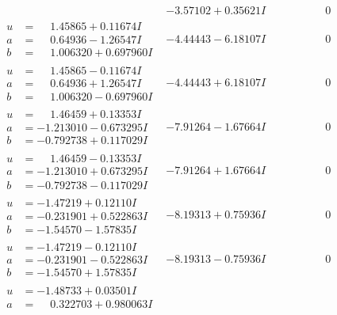 \documentclass[1p]{elsarticle_modified}
\theoremstyle{definition}
\begin{document}
$$\begin{array}{c|c|c}
 & -3.57102 + 0.35621 I & \phantom{-0.000000 } 0 \\ \hline\begin{aligned}
u &= \phantom{-}1.45865 + 0.11674 I \\
a &= \phantom{-}0.64936 - 1.26547 I \\
b &= \phantom{-}1.006320 + 0.697960 I\end{aligned}
 & -4.44443 - 6.18107 I & \phantom{-0.000000 } 0 \\ \hline\begin{aligned}
u &= \phantom{-}1.45865 - 0.11674 I \\
a &= \phantom{-}0.64936 + 1.26547 I \\
b &= \phantom{-}1.006320 - 0.697960 I\end{aligned}
 & -4.44443 + 6.18107 I & \phantom{-0.000000 } 0 \\ \hline\begin{aligned}
u &= \phantom{-}1.46459 + 0.13353 I \\
a &= -1.213010 - 0.673295 I \\
b &= -0.792738 + 0.117029 I\end{aligned}
 & -7.91264 - 1.67664 I & \phantom{-0.000000 } 0 \\ \hline\begin{aligned}
u &= \phantom{-}1.46459 - 0.13353 I \\
a &= -1.213010 + 0.673295 I \\
b &= -0.792738 - 0.117029 I\end{aligned}
 & -7.91264 + 1.67664 I & \phantom{-0.000000 } 0 \\ \hline\begin{aligned}
u &= -1.47219 + 0.12110 I \\
a &= -0.231901 + 0.522863 I \\
b &= -1.54570 - 1.57835 I\end{aligned}
 & -8.19313 + 0.75936 I & \phantom{-0.000000 } 0 \\ \hline\begin{aligned}
u &= -1.47219 - 0.12110 I \\
a &= -0.231901 - 0.522863 I \\
b &= -1.54570 + 1.57835 I\end{aligned}
 & -8.19313 - 0.75936 I & \phantom{-0.000000 } 0 \\ \hline\begin{aligned}
u &= -1.48733 + 0.03501 I \\
a &= \phantom{-}0.322703 + 0.980063 I \\

\end{aligned}
\end{array}$$
\end{document}
